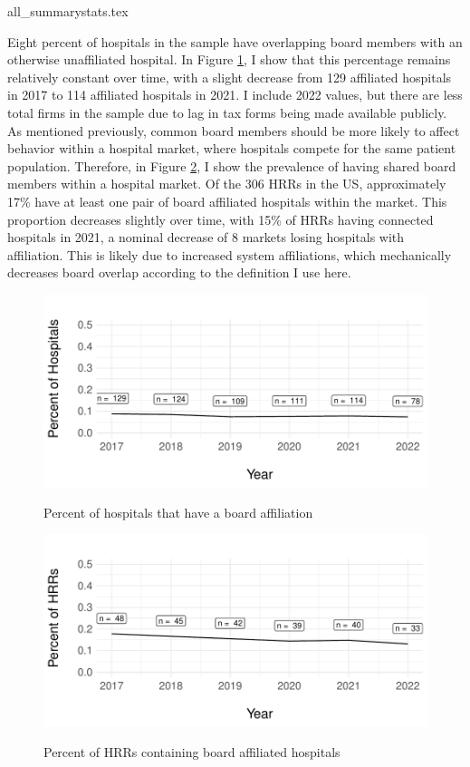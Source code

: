 \documentclass[12pt]{article}
\begin{document}
    {all_summarystats.tex}

    Eight percent of hospitals in the sample have overlapping board members with an otherwise unaffiliated hospital. In Figure \ref{fig:connected_percent}, I show that this percentage remains relatively constant over time, with a slight decrease from 129 affiliated hospitals in 2017 to 114 affiliated hospitals in 2021. I include 2022 values, but there are less total firms in the sample due to lag in tax forms being made available publicly. As mentioned previously, common board members should be more likely to affect behavior within a hospital market, where hospitals compete for the same patient population. Therefore, in Figure \ref{fig:connected_HRR_percent}, I show the prevalence of having shared board members within a hospital market. Of the 306 HRRs in the US, approximately 17\% have at least one pair of board affiliated hospitals within the market. This proportion decreases slightly over time, with 15\% of HRRs having connected hospitals in 2021, a nominal decrease of 8 markets losing hospitals with affiliation. This is likely due to increased system affiliations, which mechanically decreases board overlap according to the definition I use here. 


    \begin{figure}[ht!]
        \centering
        \vspace{9mm}
        \caption{Percent of hospitals that have a board affiliation}
        \includegraphics[width=.8\textwidth]{Objects/connected_percent.pdf}
        \label{fig:connected_percent}
    \end{figure}


    \begin{figure}[ht!]
        \centering
        \caption{Percent of HRRs containing board affiliated hospitals}
        \includegraphics[width=.8\textwidth]{Objects/connected_HRR_percent.pdf}
        \label{fig:connected_HRR_percent}
    \end{figure}
\end{document}
